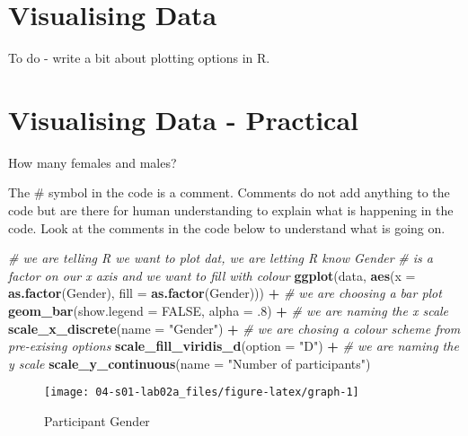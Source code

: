 \documentclass[]{book}
\newenvironment{Shaded}{\begin{snugshade}}{\end{snugshade}}
\newcommand{\KeywordTok}[1]{\textcolor[rgb]{0.13,0.29,0.53}{\textbf{#1}}}
\newcommand{\DataTypeTok}[1]{\textcolor[rgb]{0.13,0.29,0.53}{#1}}
\newcommand{\DecValTok}[1]{\textcolor[rgb]{0.00,0.00,0.81}{#1}}
\newcommand{\StringTok}[1]{\textcolor[rgb]{0.31,0.60,0.02}{#1}}
\newcommand{\CommentTok}[1]{\textcolor[rgb]{0.56,0.35,0.01}{\textit{#1}}}
\newcommand{\OtherTok}[1]{\textcolor[rgb]{0.56,0.35,0.01}{#1}}
\newcommand{\OperatorTok}[1]{\textcolor[rgb]{0.81,0.36,0.00}{\textbf{#1}}}
\newcommand{\NormalTok}[1]{#1}
\begin{document}
\section{Visualising Data}\label{visualising-data}

To do - write a bit about plotting options in R.

\section{Visualising Data -
Practical}\label{visualising-data---practical}

How many females and males?

The \# symbol in the code is a comment. Comments do not add anything to
the code but are there for human understanding to explain what is
happening in the code. Look at the comments in the code below to
understand what is going on.

\begin{Shaded}
\begin{Highlighting}[]
\CommentTok{# we are telling R we want to plot dat, we are letting R know Gender }
\CommentTok{# is a factor on our x axis and we want to fill with colour}
\KeywordTok{ggplot}\NormalTok{(data, }\KeywordTok{aes}\NormalTok{(}\DataTypeTok{x =} \KeywordTok{as.factor}\NormalTok{(Gender), }\DataTypeTok{fill =} \KeywordTok{as.factor}\NormalTok{(Gender))) }\OperatorTok{+}
\StringTok{  }\CommentTok{# we are choosing a bar plot}
\StringTok{  }\KeywordTok{geom_bar}\NormalTok{(}\DataTypeTok{show.legend =} \OtherTok{FALSE}\NormalTok{, }\DataTypeTok{alpha =}\NormalTok{ .}\DecValTok{8}\NormalTok{) }\OperatorTok{+}
\StringTok{  }\CommentTok{# we are naming the x scale}
\StringTok{  }\KeywordTok{scale_x_discrete}\NormalTok{(}\DataTypeTok{name =} \StringTok{"Gender"}\NormalTok{) }\OperatorTok{+}
\StringTok{  }\CommentTok{# we are chosing a colour scheme from pre-exising options}
\StringTok{  }\KeywordTok{scale_fill_viridis_d}\NormalTok{(}\DataTypeTok{option =} \StringTok{"D"}\NormalTok{) }\OperatorTok{+}
\StringTok{  }\CommentTok{# we are naming the y scale}
\StringTok{  }\KeywordTok{scale_y_continuous}\NormalTok{(}\DataTypeTok{name =} \StringTok{"Number of participants"}\NormalTok{)}
\end{Highlighting}
\end{Shaded}

\begin{figure}

{\centering \texttt{[image: 04-s01-lab02a\_files/figure-latex/graph-1]} 

}

\caption{Participant Gender}\label{fig:graph}
\end{figure}
\end{document}
